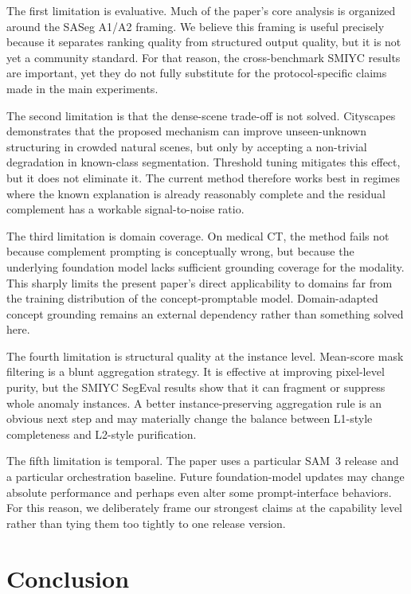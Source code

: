 \documentclass[a4paper,fleqn]{cas-dc}
\newcommand{\samthree}{SAM~3}
\begin{document}
The first limitation is evaluative. Much of the paper's core analysis is organized around the SASeg A1/A2 framing. We believe this framing is useful precisely because it separates ranking quality from structured output quality, but it is not yet a community standard. For that reason, the cross-benchmark SMIYC results are important, yet they do not fully substitute for the protocol-specific claims made in the main experiments.

The second limitation is that the dense-scene trade-off is not solved. Cityscapes demonstrates that the proposed mechanism can improve unseen-unknown structuring in crowded natural scenes, but only by accepting a non-trivial degradation in known-class segmentation. Threshold tuning mitigates this effect, but it does not eliminate it. The current method therefore works best in regimes where the known explanation is already reasonably complete and the residual complement has a workable signal-to-noise ratio.

The third limitation is domain coverage. On medical CT, the method fails not because complement prompting is conceptually wrong, but because the underlying foundation model lacks sufficient grounding coverage for the modality. This sharply limits the present paper's direct applicability to domains far from the training distribution of the concept-promptable model. Domain-adapted concept grounding remains an external dependency rather than something solved here.

The fourth limitation is structural quality at the instance level. Mean-score mask filtering is a blunt aggregation strategy. It is effective at improving pixel-level purity, but the SMIYC SegEval results show that it can fragment or suppress whole anomaly instances. A better instance-preserving aggregation rule is an obvious next step and may materially change the balance between L1-style completeness and L2-style purification.

The fifth limitation is temporal. The paper uses a particular \samthree{} release and a particular orchestration baseline. Future foundation-model updates may change absolute performance and perhaps even alter some prompt-interface behaviors. For this reason, we deliberately frame our strongest claims at the capability level rather than tying them too tightly to one release version.

\section{Conclusion}
\label{sec:conclusion}
\end{document}
